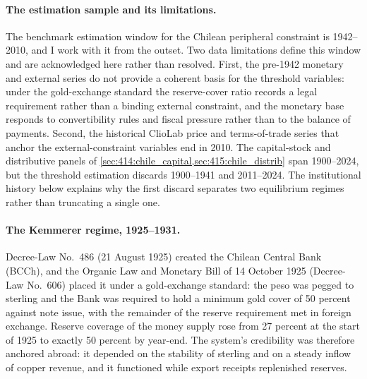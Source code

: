 \paragraph{The estimation sample and its limitations.}
The benchmark estimation window for the Chilean peripheral
constraint is 1942--2010, and I work with it from the outset. Two
data limitations define this window and are acknowledged here
rather than resolved. First, the pre-1942 monetary and external
series do not provide a coherent basis for the threshold
variables: under the gold-exchange standard the reserve-cover
ratio records a legal requirement rather than a binding external
constraint, and the monetary base responds to convertibility rules
and fiscal pressure rather than to the balance of payments.
Second, the historical ClioLab price and terms-of-trade series
that anchor the external-constraint variables end in 2010. The
capital-stock and distributive panels of
\cref{sec:414:chile_capital,sec:415:chile_distrib} span
1900--2024, but the threshold estimation discards 1900--1941 and
2011--2024. The institutional history below explains why the first
discard separates two equilibrium regimes rather than truncating a
single one.


\paragraph{The Kemmerer regime, 1925--1931.}
Decree-Law No.~486 (21 August 1925) created the Chilean Central Bank (BCCh), and the Organic Law and Monetary Bill of 14 October 1925
(Decree-Law No.~606) placed it under a gold-exchange standard: the
peso was pegged to sterling and the Bank was required to hold a
minimum gold cover of 50 percent against note issue, with the
remainder of the reserve requirement met in foreign exchange.
Reserve coverage of the money supply rose from 27 percent at the
start of 1925 to exactly 50 percent by year-end. The system's
credibility was therefore anchored abroad: it depended on the
stability of sterling and on a steady inflow of copper revenue, and
it functioned while export receipts replenished reserves.

